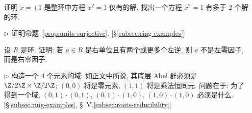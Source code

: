 \begin{prob}
\label{ex:x2-1}
证明 $x = \pm 1$ 是整环中方程 $x^2 = 1$ 仅有的解. 找出一个方程 $x^2 = 1$ 有多于 $2$ 个解的环.
\end{prob}

\begin{prob}
\label{ex:prop-units}
$\triangleright$ 证明命题~\ref{prop:units-surjective}. [\S\ref{subsec:ring-examples}]
\end{prob}

\begin{prob}
\label{ex:right-unit}
设 $R$ 是环. 证明: 若 $a \in R$ 是右单位且有两个或更多个左逆, 则 $a$ 不是左零因子, 而是右零因子.
\end{prob}

\begin{prob}
\label{ex:field-4-elements}
$\triangleright$ 构造一个 $4$ 个元素的域: 如正文中所说, 其底层 Abel 群必须是 $\Z/2\Z \times \Z/2\Z$; $(0,0)$ 将是零元素, $(1,1)$ 将是乘法恒同元. 问题在于: 为了得到一个域, $(0,1) \cdot (0,1)$, $(0,1) \cdot (1,0)$, $(1,0) \cdot (1,0)$ 必须是什么. [\S\ref{subsec:ring-examples}, \S~V.\ref{subsec:roots-reducibility}]
\end{prob}

